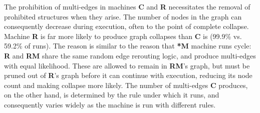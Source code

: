 \documentclass{tufte-handout}
\begin{document}
The prohibition of multi-edges in machines \textbf{C} and \textbf{R}
necessitates the removal of prohibited structures when they arise. The
number of nodes in the graph can consequently decrease during execution,
often to the point of complete collapse.
Machine \textbf{R} is far more likely to produce graph collapses than
\textbf{C} is (99.9\% vs. 59.2\% of runs). The reason is similar to the reason
that \textbf{*M} machine runs cycle: \textbf{R} and \textbf{RM} share the same
random edge rerouting logic, and produce multi-edges with equal likelihood. These are allowed to
remain in \textbf{RM}'s graph, but must be pruned out of \textbf{R}'s graph
before it can continue with execution, reducing its node count and making collapse
more likely. The number of multi-edges \textbf{C} produces, on the other hand,
is determined by the rule under which it runs, and consequently varies widely as
the machine is run with different rules.

\clearpage
\end{document}
